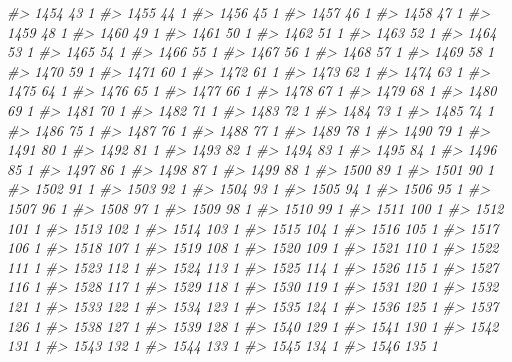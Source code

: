 \documentclass[]{article}
\newenvironment{Shaded}{\begin{snugshade}}{\end{snugshade}}
\newcommand{\CommentTok}[1]{\textcolor[rgb]{0.56,0.35,0.01}{\textit{#1}}}
\begin{document}
\begin{Shaded}
\begin{Highlighting}[]
\CommentTok{#> 1454  43  1}
\CommentTok{#> 1455  44  1}
\CommentTok{#> 1456  45  1}
\CommentTok{#> 1457  46  1}
\CommentTok{#> 1458  47  1}
\CommentTok{#> 1459  48  1}
\CommentTok{#> 1460  49  1}
\CommentTok{#> 1461  50  1}
\CommentTok{#> 1462  51  1}
\CommentTok{#> 1463  52  1}
\CommentTok{#> 1464  53  1}
\CommentTok{#> 1465  54  1}
\CommentTok{#> 1466  55  1}
\CommentTok{#> 1467  56  1}
\CommentTok{#> 1468  57  1}
\CommentTok{#> 1469  58  1}
\CommentTok{#> 1470  59  1}
\CommentTok{#> 1471  60  1}
\CommentTok{#> 1472  61  1}
\CommentTok{#> 1473  62  1}
\CommentTok{#> 1474  63  1}
\CommentTok{#> 1475  64  1}
\CommentTok{#> 1476  65  1}
\CommentTok{#> 1477  66  1}
\CommentTok{#> 1478  67  1}
\CommentTok{#> 1479  68  1}
\CommentTok{#> 1480  69  1}
\CommentTok{#> 1481  70  1}
\CommentTok{#> 1482  71  1}
\CommentTok{#> 1483  72  1}
\CommentTok{#> 1484  73  1}
\CommentTok{#> 1485  74  1}
\CommentTok{#> 1486  75  1}
\CommentTok{#> 1487  76  1}
\CommentTok{#> 1488  77  1}
\CommentTok{#> 1489  78  1}
\CommentTok{#> 1490  79  1}
\CommentTok{#> 1491  80  1}
\CommentTok{#> 1492  81  1}
\CommentTok{#> 1493  82  1}
\CommentTok{#> 1494  83  1}
\CommentTok{#> 1495  84  1}
\CommentTok{#> 1496  85  1}
\CommentTok{#> 1497  86  1}
\CommentTok{#> 1498  87  1}
\CommentTok{#> 1499  88  1}
\CommentTok{#> 1500  89  1}
\CommentTok{#> 1501  90  1}
\CommentTok{#> 1502  91  1}
\CommentTok{#> 1503  92  1}
\CommentTok{#> 1504  93  1}
\CommentTok{#> 1505  94  1}
\CommentTok{#> 1506  95  1}
\CommentTok{#> 1507  96  1}
\CommentTok{#> 1508  97  1}
\CommentTok{#> 1509  98  1}
\CommentTok{#> 1510  99  1}
\CommentTok{#> 1511 100  1}
\CommentTok{#> 1512 101  1}
\CommentTok{#> 1513 102  1}
\CommentTok{#> 1514 103  1}
\CommentTok{#> 1515 104  1}
\CommentTok{#> 1516 105  1}
\CommentTok{#> 1517 106  1}
\CommentTok{#> 1518 107  1}
\CommentTok{#> 1519 108  1}
\CommentTok{#> 1520 109  1}
\CommentTok{#> 1521 110  1}
\CommentTok{#> 1522 111  1}
\CommentTok{#> 1523 112  1}
\CommentTok{#> 1524 113  1}
\CommentTok{#> 1525 114  1}
\CommentTok{#> 1526 115  1}
\CommentTok{#> 1527 116  1}
\CommentTok{#> 1528 117  1}
\CommentTok{#> 1529 118  1}
\CommentTok{#> 1530 119  1}
\CommentTok{#> 1531 120  1}
\CommentTok{#> 1532 121  1}
\CommentTok{#> 1533 122  1}
\CommentTok{#> 1534 123  1}
\CommentTok{#> 1535 124  1}
\CommentTok{#> 1536 125  1}
\CommentTok{#> 1537 126  1}
\CommentTok{#> 1538 127  1}
\CommentTok{#> 1539 128  1}
\CommentTok{#> 1540 129  1}
\CommentTok{#> 1541 130  1}
\CommentTok{#> 1542 131  1}
\CommentTok{#> 1543 132  1}
\CommentTok{#> 1544 133  1}
\CommentTok{#> 1545 134  1}
\CommentTok{#> 1546 135  1}

\end{Highlighting}
\end{Shaded}
\end{document}
